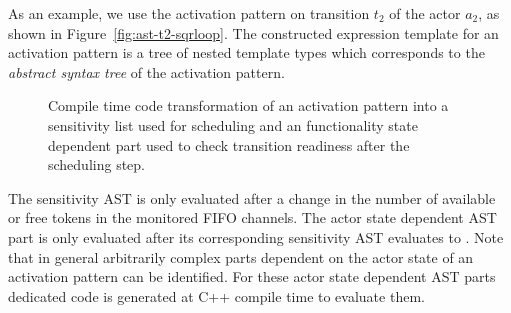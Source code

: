 



As an example, we use the activation pattern on transition $t_2$ of the  actor $a_2$, as shown in Figure~\ref{fig:ast-t2-sqrloop}.
The constructed expression template for an activation pattern is a tree of nested template types which corresponds to the \emph{abstract syntax tree} of the activation pattern.%

\begin{figure}[h]
\centering
\resizebox{\columnwidth}{!}{}
%
\caption{\label{fig:ast-t2-sqrloop}\label{fig:ast-compile-time-transform}%
Compile time code transformation of an activation pattern into a sensitivity list used for scheduling and an functionality state dependent part used to check transition readiness after the scheduling step.
}
\end{figure}

The sensitivity AST is only evaluated after a change in the number of available or free tokens in the monitored FIFO channels.
The actor state dependent AST part is only evaluated after its corresponding sensitivity AST evaluates to .
Note that in general arbitrarily complex parts dependent on the actor state of an activation pattern can be identified.
For these actor state dependent AST parts dedicated code is generated at C++ compile time to evaluate them.

